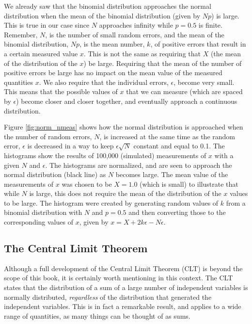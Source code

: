 We already saw that the binomial distribution approaches the normal distribution when the mean of the binomial distribution (given by $Np$) is large. This is true in our case since $N$ approaches infinity while $p=0.5$ is finite. Remember, $N$, is the number of small random errors, and the mean of the binomial distribution, $Np$, is the mean number, $k$, of positive errors that result in a certain measured value $x$. This is not the same as requiring that $X$ (the mean of the distribution of the $x$) be large. Requiring that the mean of the number of positive errors be large has no impact on the mean value of the measured quantities $x$. We also require that the individual errors, $\epsilon$, become very small. This means that the possible values of $x$ that we can measure (which are spaced by $\epsilon$) become closer and closer together, and eventually approach a continuous distribution. 

Figure \ref{fig:norm_nmeas} shows how the normal distribution is approached when the number of random errors, $N$, is increased at the same time as the random error, $\epsilon$ is decreased in a way to keep $\epsilon\sqrt{N}$ constant and equal to 0.1. The histograms show the results of 100,000 (simulated) measurements of $x$ with a given $N$ and $\epsilon$. The histograms are normalized, and are seen to approach the normal distribution (black line) as $N$ becomes large. The mean value of the measurements of $x$ was chosen to be $X=1.0$ (which is small) to illustrate that while $N$ is large, this does not require the mean of the distribution of the $x$ values to be large. The histogram were created by generating random values of $k$ from a binomial distribution with $N$ and $p=0.5$ and then converting those to the corresponding values of $x$, given by $x=X+2k\epsilon-N\epsilon$.


\subsection{The Central Limit Theorem}
Although a full development of the Central Limit Theorem (CLT) is beyond the scope of this book, it is certainly worth mentioning in this context. The CLT states that the distribution of a sum of a large number of independent variables is normally distributed, \textit{regardless} of the distribution that generated the independent variables. This is in fact a remarkable result, and applies to a wide range of quantities, as many things can be thought of as sums.

